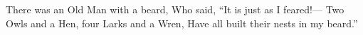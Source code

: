 \documentclass[12pt]{sigbovik-review}
\author{Prof. Jim McCann}
\begin{document}
\maketitle



There was an Old Man with a beard, \newline
Who said, ``It is just as I feared!—  \newline
Two Owls and a Hen, four Larks and a Wren,  \newline
Have all built their nests in my beard.''
\end{document}
